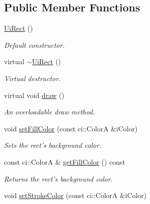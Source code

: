 \subsection*{Public Member Functions}
\begin{DoxyCompactItemize}
\item 
\hypertarget{class_ui_rect_af88622edbc6fa93079be1073c7485ff5}{\hyperlink{class_ui_rect_af88622edbc6fa93079be1073c7485ff5}{Ui\-Rect} ()}\label{class_ui_rect_af88622edbc6fa93079be1073c7485ff5}

\begin{DoxyCompactList}\small\item\em Default constructor. \end{DoxyCompactList}\item 
\hypertarget{class_ui_rect_a4df55da1ba889d440a50d5d813ce2c84}{virtual \hyperlink{class_ui_rect_a4df55da1ba889d440a50d5d813ce2c84}{$\sim$\-Ui\-Rect} ()}\label{class_ui_rect_a4df55da1ba889d440a50d5d813ce2c84}

\begin{DoxyCompactList}\small\item\em Virtual destructor. \end{DoxyCompactList}\item 
\hypertarget{class_ui_rect_ae19c538fe86ec973b28ee746f0fa775f}{virtual void \hyperlink{class_ui_rect_ae19c538fe86ec973b28ee746f0fa775f}{draw} ()}\label{class_ui_rect_ae19c538fe86ec973b28ee746f0fa775f}

\begin{DoxyCompactList}\small\item\em An overloadable draw method. \end{DoxyCompactList}\item 
\hypertarget{class_ui_rect_a0d3127768e550d40a48ad176f555f8a0}{void \hyperlink{class_ui_rect_a0d3127768e550d40a48ad176f555f8a0}{set\-Fill\-Color} (const ci\-::\-Color\-A \&i\-Color)}\label{class_ui_rect_a0d3127768e550d40a48ad176f555f8a0}

\begin{DoxyCompactList}\small\item\em Sets the rect's background color. \end{DoxyCompactList}\item 
\hypertarget{class_ui_rect_aa1094523e795bf8054dbd245bcf27890}{const ci\-::\-Color\-A \& \hyperlink{class_ui_rect_aa1094523e795bf8054dbd245bcf27890}{get\-Fill\-Color} () const }\label{class_ui_rect_aa1094523e795bf8054dbd245bcf27890}

\begin{DoxyCompactList}\small\item\em Returns the rect's background color. \end{DoxyCompactList}\item 
\hypertarget{class_ui_rect_aff76b2be9f640f03d58a64337c916c34}{void \hyperlink{class_ui_rect_aff76b2be9f640f03d58a64337c916c34}{set\-Stroke\-Color} (const ci\-::\-Color\-A \&i\-Color)}\label{class_ui_rect_aff76b2be9f640f03d58a64337c916c34}


\end{DoxyCompactItemize}
